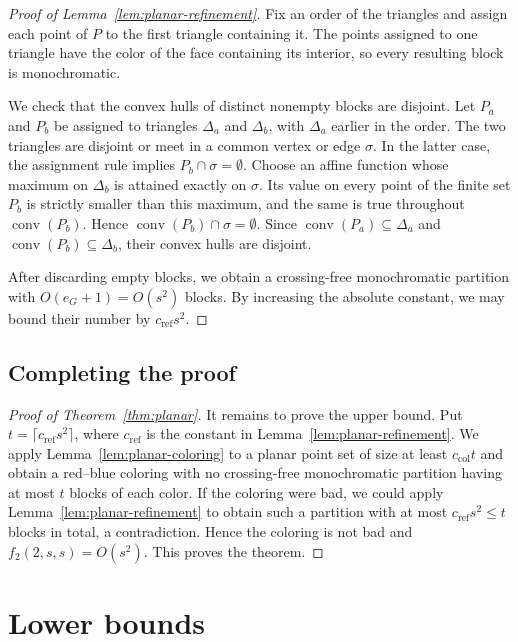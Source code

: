 \documentclass[11pt]{article}
\theoremstyle{definition}
\newcommand{\conv}{\operatorname{conv}}
\begin{document}
\begin{proof}[Proof of Lemma~\ref{lem:planar-refinement}]
Fix an order of the triangles and assign each point of \(P\) to the first triangle containing it. The points assigned to one triangle have the color of the face containing its interior, so every resulting block is monochromatic.

We check that the convex hulls of distinct nonempty blocks are disjoint. Let \(P_{a}\) and \(P_{b}\) be assigned to triangles \(\Delta_{a}\) and \(\Delta_{b}\), with \(\Delta_{a}\) earlier in the order. The two triangles are disjoint or meet in a common vertex or edge \(\sigma\). In the latter case, the assignment rule implies \(P_{b}\cap\sigma=\emptyset\). Choose an affine function whose maximum on \(\Delta_{b}\) is attained exactly on \(\sigma\). Its value on every point of the finite set \(P_{b}\) is strictly smaller than this maximum, and the same is true throughout \(\conv(P_{b})\). Hence \(\conv(P_{b})\cap\sigma=\emptyset\). Since \(\conv(P_{a})\subseteq\Delta_{a}\) and \(\conv(P_{b})\subseteq\Delta_{b}\), their convex hulls are disjoint.

After discarding empty blocks, we obtain a crossing-free monochromatic partition with \(O(e_{G}+1)=O(s^{2})\) blocks. By increasing the absolute constant, we may bound their number by \(c_{\mathrm{ref}}s^{2}\).
\end{proof}

\subsection{Completing the proof}

\begin{proof}[Proof of Theorem~\ref{thm:planar}]
It remains to prove the upper bound. Put \(t=\lceil c_{\mathrm{ref}}s^{2}\rceil\), where \(c_{\mathrm{ref}}\) is the constant in Lemma~\ref{lem:planar-refinement}. We apply Lemma~\ref{lem:planar-coloring} to a planar point set of size at least \(c_{\mathrm{col}}t\) and obtain a red--blue coloring with no crossing-free monochromatic partition having at most \(t\) blocks of each color. If the coloring were bad, we could apply Lemma~\ref{lem:planar-refinement} to obtain such a partition with at most \(c_{\mathrm{ref}}s^{2}\le t\) blocks in total, a contradiction. Hence the coloring is not bad and \(f_{2}(2,s,s)=O(s^{2})\). This proves the theorem.
\end{proof}

\section{Lower bounds}
\end{document}
